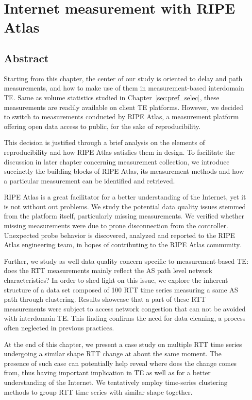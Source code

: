 \chapter{Internet measurement with RIPE Atlas}
\label{sec:ripe_atlas}
\section*{Abstract}
Starting from this chapter, the center of our study is oriented to delay and path measurements, and how to make use of them in measurement-based interdomain \ac{TE}.
Same as volume statistics studied in Chapter~\ref{sec:pref_selec}, these measurements are readily available on client TE platforms.
However, we decided to switch to measurements conducted by RIPE Atlas, a measurement platform offering open data access to public, for the sake of reproducibility.

This decision is justified through a brief analysis on the elements of reproducibility and how RIPE Atlas satisfies them in design.
To facilitate the discussion in later chapter concerning measurement collection, we introduce succinctly the building blocks of RIPE Atlas, its measurement methods and how a particular measurement can be identified and retrieved.

RIPE Atlas is a great facilitator for a better understanding of the Internet, yet it is not without out problems. We study the potential data quality issues stemmed from the platform itself, particularly missing measurements. We verified whether missing measurements were due to prone disconnection from the controller.
Unexpected probe behavior is discovered, analyzed and reported to the RIPE Atlas engineering team, in hopes of contributing to the RIPE Atlas community.

Further, we study as well data quality concern specific to measurement-based TE: does the RTT measurements mainly reflect the AS path level network characteristics?
In order to shed light on this issue, we explore the inherent structure of a data set composed of 100 RTT time series measuring a same AS path through clustering.
Results showcase that a part of these RTT measurements were subject to access network congestion that can not be avoided with interdomain TE. This finding confirms the need for data cleaning, a process often neglected in previous practices.

At the end of this chapter, we present a case study on multiple RTT time series undergoing a similar shape RTT change at about the same moment. The presence of such case can potentially help reveal where does the change comes from, thus having important implication in TE as well as for a better understanding of the Internet. We tentatively employ time-series clustering methods to group RTT time series with similar shape together.
\clearpage

